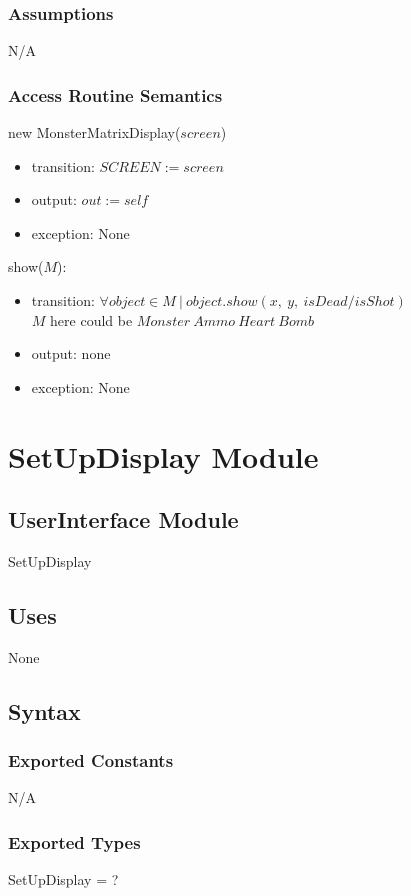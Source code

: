 \documentclass[12pt]{article}
\begin{document}
\subsubsection*{Assumptions}
N/A
\subsubsection*{Access Routine Semantics}
new MonsterMatrixDisplay($screen$)
\begin{itemize}
    \item transition: $SCREEN := screen$ 
    \item output: $out := self$
    \item exception: None
\end{itemize}

\noindent show($M$):
\begin{itemize}
    \item transition: $\forall object \in M\ |\ object.show(x,\ y,\ isDead/isShot)$\\
    $M$ here could be $Monster\ Ammo\ Heart\ Bomb$
    \item output: none
    \item exception: None
\end{itemize}
\newpage

\section{SetUpDisplay Module}

\subsection*{UserInterface Module}
SetUpDisplay
\subsection*{Uses}
None

\subsection*{Syntax}
\subsubsection*{Exported Constants}
N/A
\subsubsection*{Exported Types}
SetUpDisplay = ?
\end{document}
